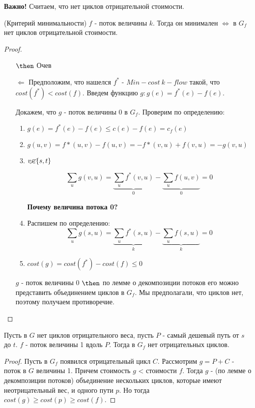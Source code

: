 \textbf{Важно!} Считаем, что нет циклов отрицательной стоимости.

\begin{lemma}{(Критерий минимальности)}
  $f$ - поток величины $k$. Тогда он минимален $\Longleftrightarrow$ в $G_f$ нет циклов отрицательной стоимости.
\end{lemma}

\begin{proof}
\text{}

  \begin{enumerate}
    \item[$\then$] Очев
    \item[$\Longleftarrow$] Предположим, что нашелся $f^*$ - $Min-cost \ k-flow$ такой, что $cost(f^*) < cost(f)$. Введем функцию $g: g(e) = f^*(e) - f(e)$.
    
    Докажем, что $g$ - поток величины 0 в \underline{$G_f$}. Проверим по определению:

    \begin{enumerate}
      \item $g(e) = f^*(e) - f(e) \le c(e) - f(e) = c_f(e)$
      \item $g(u, v) = f*(u, v) - f(u, v) = -f*(v, u) + f(v, u) = -g(v, u)$
      \item $v \cancel{\in} \{s, t\}$
      
      $$\sum_{u}{g(v, u)} = \underbrace{\sum_{u}f^*(v, u)}_{0} - \underbrace{\sum_{u}f(u, v)}_{0} = 0 $$

      \textbf{Почему величина потока 0?}

    \item Распишем по определению:
   $$\sum_{u}{g(s, u)} = \underbrace{\sum_{u}f^*(s, u)}_{k} - \underbrace{\sum_{u}f(s, u)}_{k} = 0 $$

   \item $cost(g) =  cost(f^*) - cost(f) \le 0$
  \end{enumerate}

  $g$ - поток величины 0 $\then$ по лемме о декомпозиции потоков его можно представить объединением циклов в $G_f$. Мы предполагали, что циклов нет, поэтому получаем противоречие. 


  \end{enumerate}
\end{proof}

\begin{proposition}
  Пусть в $G$ нет циклов отрицательного веса, пусть $P$ - самый дешевый путь от $s$ до $t$. $f$ - поток величины 1 вдоль $P$. Тогда в $G_f$ нет отрицательных циклов. 
\end{proposition}
\begin{proof}
  Пусть в $G_f$ появился отрицательный цикл $C$. Рассмотрим $g = P + C$ - поток в $G$ величины 1. Причем стоимость $g$ < стоимости $f$. Тогда $g$ - (по лемме о декомпозиции потоков) объединение нескольких циклов, которые имеют неотрицательный вес, и одного пути $p$. Но тогда $cost(g) \ge cost(p) \ge cost(f)$.  
\end{proof}

